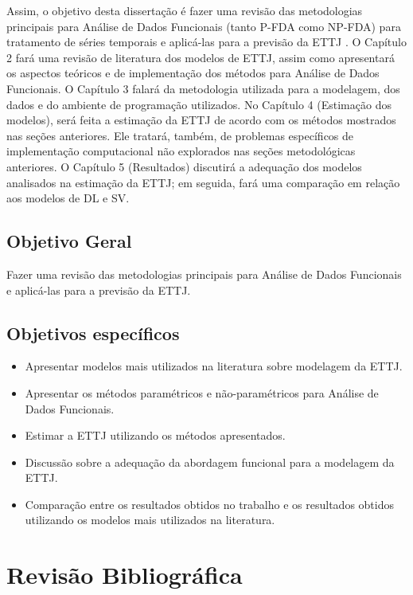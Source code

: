\documentclass[
	12pt,				%
	openright,			%
	oneside,			%
	a4paper,			%
	english,			%
	brazil				%
	]{dissertacao-ufrgs-abntex2}
\begin{document}
Assim, o objetivo desta dissertação é fazer uma revisão das metodologias
principais para Análise de Dados Funcionais (tanto P-FDA como NP-FDA)
para tratamento de séries temporais e aplicá-las para a previsão da
ETTJ . O Capítulo 2 fará uma revisão de literatura dos modelos de
ETTJ, assim como apresentará os aspectos teóricos e de implementação
dos métodos para Análise de Dados Funcionais. O Capítulo 3 falará
da metodologia utilizada para a modelagem, dos dados e do ambiente
de programação utilizados. No Capítulo 4 (Estimação dos modelos),
será feita a estimação da ETTJ de acordo com os métodos mostrados
nas seções anteriores. Ele tratará, também, de problemas específicos
de implementação computacional não explorados nas seções metodológicas
anteriores. O Capítulo 5 (Resultados)  discutirá a adequação dos modelos
analisados na estimação da ETTJ; em seguida, fará uma comparação em
relação aos modelos de DL e SV. 



\section*{Objetivo Geral}

Fazer uma revisão das metodologias principais para Análise de Dados Funcionais e aplicá-las para a previsão da ETTJ. 

\section*{Objetivos específicos}

\begin{itemize}
\item Apresentar modelos mais utilizados na literatura sobre modelagem da
ETTJ.
\item Apresentar os métodos paramétricos e não-paramétricos para Análise
de Dados Funcionais.
\item Estimar a ETTJ utilizando os métodos apresentados.
\item Discussão sobre a adequação da abordagem funcional para a modelagem
da ETTJ.
\item Comparação entre os resultados obtidos no trabalho e os resultados
obtidos utilizando os modelos mais utilizados na literatura. \end{itemize}


\chapter{Revisão Bibliográfica}
\end{document}
